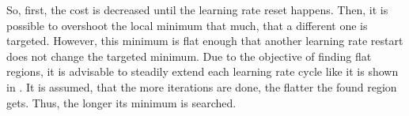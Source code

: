 So, first, the cost is decreased until the learning rate reset happens.
Then, it is possible to overshoot the local minimum that much, that a different one is targeted.
However, this minimum is flat enough that another learning rate restart does not change the targeted minimum.
Due to the objective of finding flat regions, it is advisable to steadily extend each learning rate cycle like it is shown in .
It is assumed, that the more iterations are done, the flatter the found region gets.
Thus, the longer its minimum is searched.
